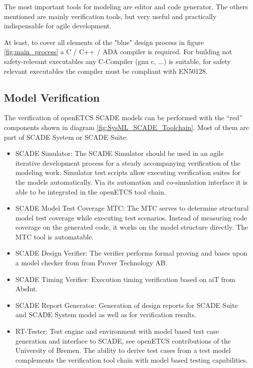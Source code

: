 The most important tools for modeling are editor and code generator. The others mentioned are mainly verification tools, but very useful and practically indispensable for agile development.

At least, to cover all elements of the "blue" design process in figure \ref{fig:main_process} a C / C++ / ADA compiler is required. 
For building not safety-relevant executables any C-Compiler (gnu c, ...) is suitable, for safety relevant executables the compiler must be compliant with EN50128.   

\subsection{Model Verification}
\label{sec:SysML_SCADE_ModelVerification}

The verification of openETCS SCADE models can be performed with the "`red"' components shown in diagram \ref{fig:SysML_SCADE_Toolchain}. Most of them are part of SCADE System or SCADE Suite:

\begin{itemize}
	\item SCADE Simulator: The SCADE Simulator should be used in an agile iterative development process for a steady accompanying verification of the modeling work. Simulator test scripts allow executing verification suites for the models automatically. Via its automation and co-simulation interface it is able to be integrated in the openETCS tool chain. 
	\item  SCADE Model Test Coverage MTC: The MTC serves to determine structural model test coverage while executing test scenarios. Instead of measuring code coverage on the generated code, it works on the model structure directly. The MTC tool is automatable. 
	\item SCADE Design Verifier: The verifier performs formal proving and bases upon a model checker from from Prover Technology AB.  
	\item SCADE Timing Verifier: Execution timing verification based on aiT from AbsInt.
	\item SCADE Report Generator: Generation of design reports for SCADE Suite and SCADE System model as well as for verification results. 
	\item RT-Tester: Test engine and environment with model based test case generation and interface to SCADE, see openETCS contributions of the University of Bremen. The ability to derive test cases from a test model complements the verification tool chain with model based testing capabilities.  
\end{itemize}
  

